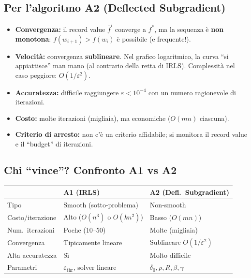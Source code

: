 \documentclass[a4paper,11pt]{article}
\theoremstyle{definition}
\begin{document}
\subsection{Per l'algoritmo A2 (Deflected Subgradient)}
\begin{itemize}
  \item \textbf{Convergenza:} il record value $\bar{f}^i$ converge a $f^*$, ma la sequenza è \textbf{non monotona}: $f(w_{i+1}) > f(w_i)$ è possibile (e frequente!).
  \item \textbf{Velocità:} convergenza \textbf{sublineare}. Nel grafico logaritmico, la curva ``si appiattisce'' man mano (al contrario della retta di IRLS). Complessità nel caso peggiore: $O(1/\varepsilon^2)$.
  \item \textbf{Accuratezza:} difficile raggiungere $\varepsilon < 10^{-4}$ con un numero ragionevole di iterazioni.
  \item \textbf{Costo:} molte iterazioni (migliaia), ma economiche ($O(mn)$ ciascuna).
  \item \textbf{Criterio di arresto:} non c'è un criterio affidabile; si monitora il record value e il ``budget'' di iterazioni.
\end{itemize}

\subsection{Chi ``vince''? Confronto A1 vs A2}
\begin{center}
\begin{tabular}{lll}
\toprule
& \textbf{A1 (IRLS)} & \textbf{A2 (Defl.\ Subgradient)} \\
\midrule
Tipo & Smooth (sotto-problema) & Non-smooth \\
Costo/iterazione & Alto ($O(n^3)$ o $O(kn^2)$) & Basso ($O(mn)$) \\
Num.\ iterazioni & Poche (10--50) & Molte (migliaia) \\
Convergenza & Tipicamente lineare & Sublineare $O(1/\varepsilon^2)$ \\
Alta accuratezza & Sì & Molto difficile \\
Parametri & $\varepsilon_{\text{thr}}$, solver lineare & $\delta_0, \rho, R, \beta, \gamma$ \\
\bottomrule
\end{tabular}
\end{center}
\end{document}
